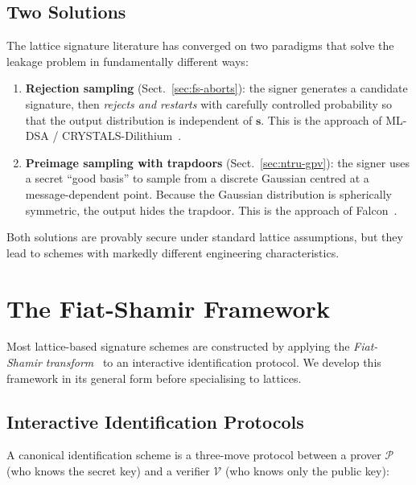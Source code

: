 \subsection{Two Solutions}
\label{subsec:two-solutions}

The lattice signature literature has converged on two paradigms that solve the leakage problem in fundamentally different ways:

\begin{enumerate}
\item \textbf{Rejection sampling} (Sect.~\ref{sec:fs-aborts}): the signer generates a candidate signature, then \emph{rejects and restarts} with carefully controlled probability so that the output distribution is independent of $\mathbf{s}$.  This is the approach of ML-DSA / CRYSTALS-Dilithium~\cite{Dilithium2018}.

\item \textbf{Preimage sampling with trapdoors} (Sect.~\ref{sec:ntru-gpv}): the signer uses a secret ``good basis'' to sample from a discrete Gaussian centred at a message-dependent point.  Because the Gaussian distribution is spherically symmetric, the output hides the trapdoor.  This is the approach of Falcon~\cite{Falcon2020}.
\end{enumerate}

Both solutions are provably secure under standard lattice assumptions, but they lead to schemes with markedly different engineering characteristics.


\section{The Fiat-Shamir Framework}
\label{sec:fiat-shamir}

Most lattice-based signature schemes are constructed by applying the \emph{Fiat-Shamir transform}~\cite{FiatShamir1986} to an interactive identification protocol.  We develop this framework in its general form before specialising to lattices.

\subsection{Interactive Identification Protocols}
\label{subsec:id-protocols}

A canonical identification scheme is a three-move protocol between a prover $\mathcal{P}$ (who knows the secret key) and a verifier $\mathcal{V}$ (who knows only the public key):

